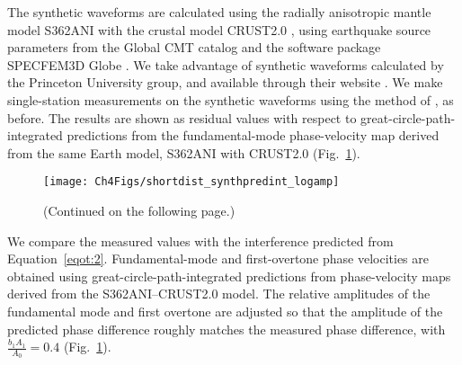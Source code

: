 \documentclass[12pt,oneside]{book}
\begin{document}
The synthetic waveforms are calculated using the radially anisotropic mantle model S362ANI \citep{Kustowskietal2008} with the crustal model CRUST2.0 \citep{CRUST2}, using earthquake source parameters from the Global CMT catalog \cite{Ekstrom2012} and the software package SPECFEM3D Globe \citep{KomatitschTromp2002a,KomatitschTromp2002b}. We take advantage of synthetic waveforms calculated by the Princeton University group, and available through their website \citep{Tromp2010}. We make single-station measurements on the synthetic waveforms using the method of \citet{Ekstrom1997}, as before. The results are shown as residual values with respect to great-circle-path-integrated predictions from the fundamental-mode phase-velocity map derived from the same Earth model, S362ANI with CRUST2.0 (Fig.~\ref{figot:specfempred_short}). 

\begin{figure} 
\begin{center}
\texttt{[image: Ch4Figs/shortdist\_synthpredint\_logamp]} 
\caption[Comparison of contamination in measured synthetic, predicted, and observed single-station phase and amplitude]{(Continued on the following page.)}
\label{figot:specfempred_short}
\end{center}
\end{figure}
\begin{figure}[t]
\end{figure}
%

We compare the measured values with the interference predicted from Equation~\ref{eqot:2}. Fundamental-mode and first-overtone phase velocities are obtained using great-circle-path-integrated predictions from phase-velocity maps derived from the S362ANI--CRUST2.0 model. The relative amplitudes of the fundamental mode and first overtone are adjusted so that the amplitude of the predicted phase difference roughly matches the measured phase difference, with $\frac{b_1 A_1}{A_0} = 0.4$ (Fig.~\ref{figot:specfempred_short}). 
\end{document}
